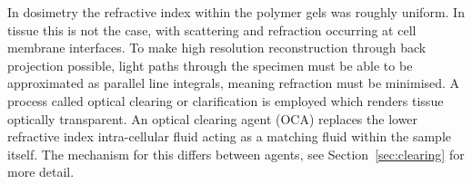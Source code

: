 \documentclass[12pt]{article}
\begin{document}
In dosimetry the refractive index within the polymer gels was roughly uniform. In tissue this is not the case, with scattering and refraction occurring at cell membrane interfaces. To make high resolution reconstruction through back projection possible, light paths through the specimen must be able to  be approximated as parallel line integrals, meaning refraction must be minimised. A process called optical clearing or clarification is employed which renders tissue optically transparent. An optical clearing agent (OCA) replaces the lower refractive index intra-cellular fluid acting as a matching fluid within the sample itself. The mechanism for this differs between agents, see Section~\ref{sec:clearing} for more detail. 





\begin{figure}[H]
\centering
{}

\end{figure}
\end{document}
